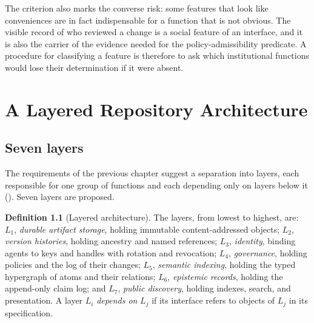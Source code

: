 \documentclass[11pt,twoside,openright]{book}
\theoremstyle{plain}
\theoremstyle{definition}
\newtheorem{definition}[theorem]{Definition}
\theoremstyle{remark}
\begin{document}
The criterion also marks the converse risk: some features that look like conveniences are in fact indispensable for a function that is not obvious. The visible record of who reviewed a change is a social feature of an interface, and it is also the carrier of the evidence needed for the policy-admissibility predicate. A procedure for classifying a feature is therefore to ask which institutional functions would lose their determination if it were absent.

\chapter{A Layered Repository Architecture}\label{ch:layers}

\section{Seven layers}

The requirements of the previous chapter suggest a separation into layers, each responsible for one group of functions and each depending only on layers below it (). Seven layers are proposed.

\begin{definition}[Layered architecture]\label{def:layered}
The layers, from lowest to highest, are: $L_1$, \emph{durable artifact storage}, holding immutable content-addressed objects; $L_2$, \emph{version histories}, holding ancestry and named references; $L_3$, \emph{identity}, binding agents to keys and handles with rotation and revocation; $L_4$, \emph{governance}, holding policies and the log of their changes; $L_5$, \emph{semantic indexing}, holding the typed hypergraph of atoms and their relations; $L_6$, \emph{epistemic records}, holding the append-only claim log; and $L_7$, \emph{public discovery}, holding indexes, search, and presentation. A layer $L_i$ \emph{depends on} $L_j$ if its interface refers to objects of $L_j$ in its specification.
\end{definition}
\end{document}

